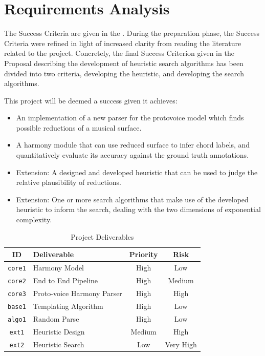 \documentclass[12pt,a4paper,twoside,openany]{report} \usepackage[pdfborder={0 0 0}]{hyperref}    %
\theoremstyle{definition} \newtheorem{definition}{Definition}[section]
\begin{document}
\section{Requirements Analysis}
\label{sec:requirementsAnalysis}
The Success Criteria are given in the . During the preparation phase, the Success Criteria were
refined in light of increased clarity from reading the literature related to the project. Concretely, the final Success
Criterion given in the Proposal describing the development of heuristic search algorithms has been divided into two
criteria, developing the heuristic, and developing the search algorithms.

This project will be deemed a success given it achieves: 
\begin{itemize} 
  \item An implementation of a new parser for the protovoice model which finds possible reductions of a musical surface. 
  \item A harmony module that can use reduced surface to infer chord labels, and quantitatively evaluate its accuracy against the ground truth annotations. 
  \item Extension: A designed and developed heuristic that can be used to judge the relative plausibility of reductions. 
  \item Extension: One or more search algorithms that make use of the developed heuristic to inform the search, dealing with the two dimensions of exponential complexity. 
\end{itemize} 

\begin{table}[h] \caption{Project Deliverables} 
  \vspace{\baselineskip} 
  \label{tab:deliverables} 
  \centering
  \begin{tabularx}{0.9\textwidth}{cXcc} 
    {\large \textbf{ID}} & \large \textbf{Deliverable} & \large \textbf{Priority} & \large \textbf{Risk} \\ 
    \toprule 
    \texttt{core1} & Harmony Model & High & Low \\ 
    \texttt{core2} & End to End Pipeline & High & Medium \\ 
    \texttt{core3} & Proto-voice Harmony Parser & High & High \\ 
    \texttt{base1} & Templating Algorithm & High & Low \\ 
    \texttt{algo1} & Random Parse & High & Low \\ 
    \texttt{ext1} & Heuristic Design & Medium & High \\
    \texttt{ext2} & Heuristic Search & Low & Very High \\
\end{tabularx} \end{table}
\end{document}
